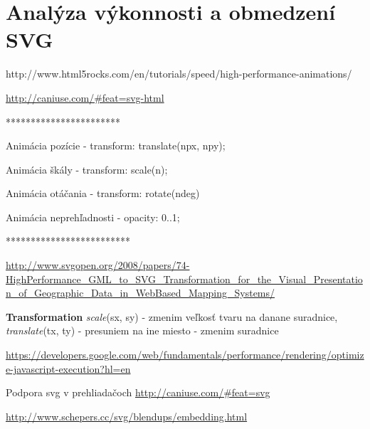 \chapter{Analýza výkonnosti a obmedzení SVG}


http://www.html5rocks.com/en/tutorials/speed/high-performance-animations/

\url{http://caniuse.com/#feat=svg-html}


***********************

Animácia pozície 
- transform: translate(npx, npy);

Animácia škály 
- transform: scale(n);

Animácia otáčania
- transform: rotate(ndeg)

Animácia neprehľadnosti 
- opacity: 0..1;

*************************

\url{http://www.svgopen.org/2008/papers/74-HighPerformance_GML_to_SVG_Transformation_for_the_Visual_Presentation_of_Geographic_Data_in_WebBased_Mapping_Systems/}


\textbf{Transformation}
\textit{scale}(sx, sy) - zmenim veľkosť tvaru na danane suradnice, 
\textit{translate}(tx, ty) - presuniem na ine miesto - zmenim suradnice 

\url{https://developers.google.com/web/fundamentals/performance/rendering/optimize-javascript-execution?hl=en}

Podpora svg v prehliadačoch
\url{http://caniuse.com/#feat=svg}

\url{http://www.schepers.cc/svg/blendups/embedding.html}